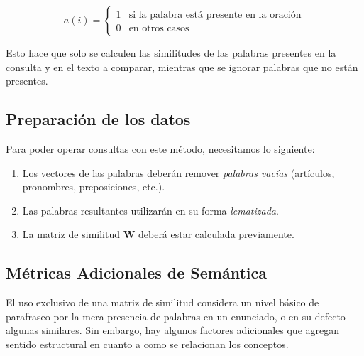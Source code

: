 \begin{equation*}
a(i) = 
    \begin{cases}
        1 & \text{si la palabra está presente en la oración}\\
        0 & \text{en otros casos}
    \end{cases}
\end{equation*}

Esto hace que solo se calculen las similitudes de las palabras presentes en la consulta y en el texto a comparar, mientras que se ignorar palabras que no están presentes.\textbf{}

\subsection{Preparación de los datos}

Para poder operar consultas con este método, necesitamos lo siguiente:

\begin{enumerate}
    \item Los vectores de las palabras deberán remover \textit{palabras vacías} (artículos, pronombres, preposiciones, etc.).
    \item Las palabras resultantes utilizarán en su forma \textit{lematizada}.
    \item \label{itm:matriz-w} La matriz de similitud $\mathbf{W}$ deberá estar calculada previamente.
\end{enumerate}

\subsection{Métricas Adicionales de Semántica}

El uso exclusivo de una matriz de similitud considera un nivel básico de parafraseo por la mera presencia de palabras en un enunciado, o en su defecto algunas similares. Sin embargo, hay algunos factores adicionales que agregan sentido estructural en cuanto a como se relacionan los conceptos. \parencite{batetsanchesvalls2010semantic}

